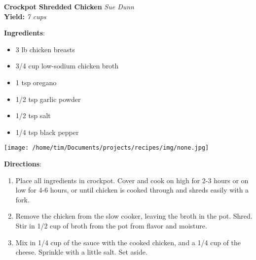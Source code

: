 \documentclass[11pt, twoside, openany]{book}
\begin{document}
\noindent\begin{minipage}[t]{\linewidth}%
{\Large\textbf{Crockpot Shredded Chicken}} \label{crockpot-shredded-chicken}\hfill\textit{Sue Dunn}\\
\textbf{Yield:} \textit{7 cups}\\
\noindent\begin{minipage}[t]{0.78\linewidth}%
\textbf{Ingredients}:\vspace{-3mm}
\begin{multicols}{2}
\begin{itemize}\setlength\itemsep{-1mm}
\item 3 lb chicken breasts
\item 3/4 cup low-sodium chicken broth
\item 1 tsp oregano
\item 1/2 tsp garlic powder
\item 1/2 tsp salt
\item 1/4 tsp black pepper
\end{itemize}
\end{multicols}
\end{minipage}
\noindent\begin{minipage}[t]{0.18\linewidth}
\centering \strut\vspace*{-\baselineskip}\newline
\texttt{[image: /home/tim/Documents/projects/recipes/img/none.jpg]}\\
\end{minipage}\vspace{3mm}
\textbf{Directions}:
\vspace{-3mm}\begin{enumerate}\setlength\itemsep{-1mm}
\item Place all ingredients in crockpot. Cover and cook on high for 2-3 hours or on low for 4-6 hours, or until chicken is cooked through and shreds easily with a fork.
\item Remove the chicken from the slow cooker, leaving the broth in the pot. Shred. Stir in 1/2 cup of broth from the pot from flavor and moisture.
\item Mix in 1/4 cup of the sauce with the cooked chicken, and a 1/4 cup of the cheese. Sprinkle with a little salt. Set aside.
\end{enumerate}
\end{minipage}\vspace{8mm}
\end{document}
